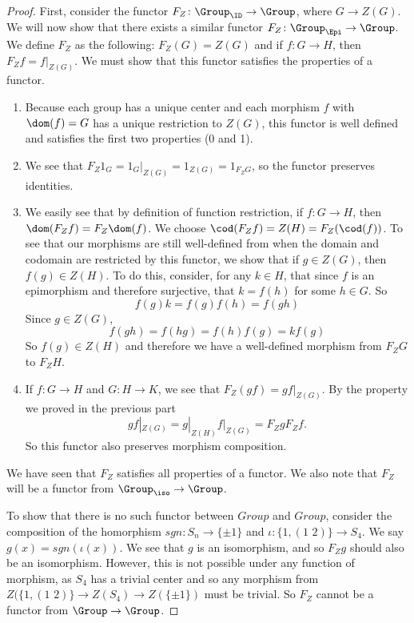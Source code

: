 \documentclass[main.tex]{subfiles}
\begin{document}
\begin{proof}


First, consider the functor $F_Z\colon \Group_{\ID}\rightarrow \Group$, where $G \rightarrow Z(G)$. We will now show that there exists a similar functor $F_Z\colon \Group_{\Epi} \rightarrow \Group$. We define $F_Z$ as the following: $F_Z(G) = Z(G)$ and if $f\colon G \rightarrow H$, then $F_{Z} f = f|_{Z(G)}$. We must show that this functor satisfies the properties of a functor.
\begin{enumerate}
    \item Because each group has a unique center and each morphism $f$ with $\dom(f) = G$ has a unique restriction to $Z(G)$, this functor is well defined and satisfies the first two properties (0 and 1).
    \item We see that $F_{Z} 1_{G} = 1_{G}|_{Z(G)} = 1_{Z(G)} = 1_{F_{Z}G}$, so the functor preserves identities. 
    \item We easily see that by definition of function restriction, if $f\colon G \rightarrow H$, then $\dom(F_{Z}f) = F_{Z}\dom(f)$. We choose $\cod(F_{Z}f) = Z(H) = F_Z(\cod(f))$.  To see that our morphisms are still well-defined from when the domain and codomain are restricted by this functor, we show that if $g \in Z(G)$, then $f(g) \in Z(H)$. To do this, consider, for any $k \in H$, that since $f$ is an epimorphism and therefore surjective, that $k = f(h)$ for some $h \in G$. So \[f(g)k = f(g)f(h) = f(gh)\]Since $g \in Z(G)$, \[f(gh) = f(hg) = f(h)f(g) = kf(g)\] So $f(g) \in Z(H)$ and therefore we have a well-defined morphism from $F_ZG$ to $F_ZH$. 
    \item If $f\colon G \rightarrow H$ and $G\colon H \rightarrow K$, we see that $F_Z(gf) = gf|_{Z(G)}$. By the property we proved in the previous part \[gf|_{Z(G)} = g|_{Z(H)}f|_{Z(G)} = F_ZgF_Zf.\] So this functor also preserves morphism composition. 
\end{enumerate}

We have seen that $F_Z$ satisfies all properties of a functor. We also note that $F_Z$ will be a functor from $\Group_{\iso} \rightarrow \Group$. 

To show that there is no such functor between $Group$ and $Group$, consider the composition of the homorphism $sgn\colon S_n \rightarrow \{ \pm 1 \} $ and $\iota\colon \{1, (1 \,\, 2) \} \rightarrow S_4$. We say $ g(x) = sgn(\iota(x))$. We see that $g$ is an isomorphism, and so $F_Zg$ should also be an isomorphism. However, this is not possible under any function of morphism, as $S_4$ has a trivial center and so any morphism from $Z(\{1, (1\,\,2)\} \rightarrow Z(S_4) \rightarrow Z(\{\pm 1\})$ must be trivial. So $F_Z$ cannot be a functor from $\Group \rightarrow \Group$.  


\end{proof}
\end{document}
